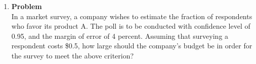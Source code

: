 \documentclass[12pt]{article}
\newenvironment{Ex}{\textbf{Problem}\vspace{.75em}\\}{}
\begin{document}
\begin{enumerate}
\begin{Ex}
\begin{solution}
\begin{enumerate}
\begin{table}[H]
\begin{tabularx}{\linewidth}{XX}
\begin{equation}
\begin{aligned}
                0 &\le (y-50)^{1/3} \\
                0 &\le y-50 \\
                \implies y &\ge 50 \\
              \end{aligned}
            \end{equation}
          \end{tabularx}
        \end{table}
        For precision,
        \begin{equation}
          \label{eq:4b-sol}
          \implies f_Y(y) = \left \{
            \begin{aligned}
              & \frac{1}{30 (y-50)^{2/3}} &&\quad y\le 1050 \\
              & 0 &&\quad\text{otherwise} \\
            \end{aligned} \right.
        \end{equation}
      \item It was given that $\hat{y}$ is constant and
        $E[\hat{V}]=16$. and we are tasked to find $\hat{y}$.
        \begin{equation}
          \label{eq:4c-sol}
          \begin{aligned}
            \hat{y} &= 50 + (\hat{v} + w - 15)^3 \\
            \hat{y} - 50 &= (\hat{v} + w - 15)^3 \\
            (\hat{y} - 50)^{1/3} &= \hat{v} + w - 15 \\
            &= E[\hat{V} + W - 15] \\
            &= E[\hat{V}] + E[W] - 15 \\
            &= 16+5-16 \\
            &= 6 \\
            \hat{y} - 50 &= 216 \\
            \implies \hat{y} &= 266 \\
          \end{aligned}
        \end{equation}
      \item {\color{red} \huge TODO}
      \end{enumerate}
    \end{solution}
  \end{Ex}

\item
  \begin{Ex}
    In a market survey, a company wishes to estimate the fraction of
    respondents who favor its product A. The poll is to be conducted
    with confidence level of 0.95, and the margin of error of 4
    percent. Assuming that surveying a respondent costs \$0.5, how
    large should the company’s budget be in order for the survey to
    meet the above criterion?


\end{Ex}
\end{enumerate}
\end{document}
